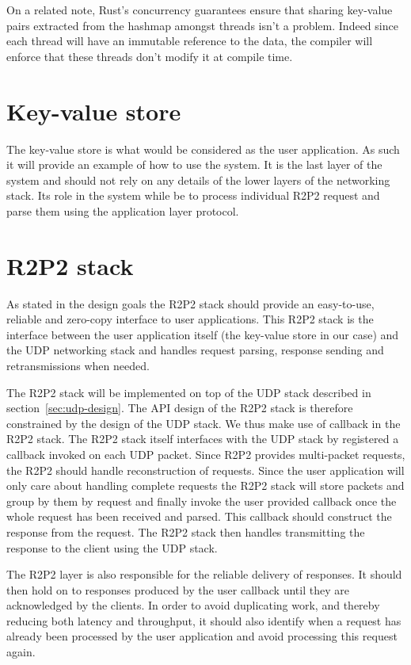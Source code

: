 On a related note, Rust's concurrency guarantees ensure that sharing
key-value pairs extracted from the hashmap amongst threads isn't a
problem. Indeed since each thread will have an immutable reference to
the data, the compiler will enforce that these threads don't modify it
at compile time.

\section{Key-value store}

The key-value store is what would be considered as the user
application. As such it will provide an example of how to use the
system. It is the last layer of the system and should not rely on any
details of the lower layers of the networking stack. Its role in the
system while be to process individual R2P2 request and parse them
using the application layer protocol.

\section{R2P2 stack}

As stated in the design goals the R2P2 stack should provide an
easy-to-use, reliable and zero-copy interface to user
applications. This R2P2 stack is the interface between the user
application itself (the key-value store in our case) and the UDP
networking stack and handles request parsing, response sending and
retransmissions when needed.

The R2P2 stack will be implemented on top of the UDP stack described in
section~\ref{sec:udp-design}. The API design of the R2P2 stack is
therefore constrained by the design of the UDP stack. We thus make use
of callback in the R2P2 stack. The R2P2 stack itself interfaces with
the UDP stack by registered a callback invoked on each UDP
packet. Since R2P2 provides multi-packet requests, the R2P2 should
handle reconstruction of requests. Since the user application will
only care about handling complete requests the R2P2 stack will store
packets and group by them by request and finally invoke the user
provided callback once the whole request has been received and
parsed. This callback should construct the response from the
request. The R2P2 stack then handles transmitting the response to the
client using the UDP stack.

The R2P2 layer is also responsible for the reliable delivery of
responses. It should then hold on to responses produced by the user
callback until they are acknowledged by the clients. In order to avoid
duplicating work, and thereby reducing both latency and throughput,
it should also identify when a request has already been processed by
the user application and avoid processing this request again.

